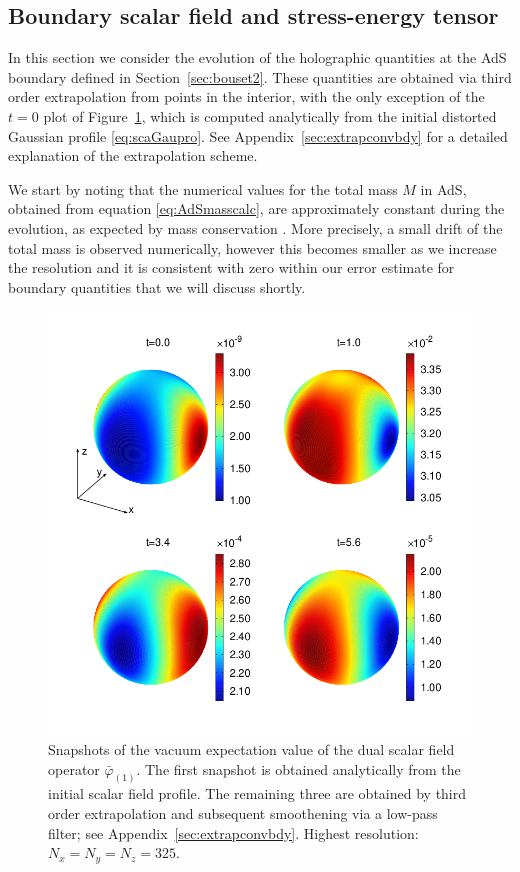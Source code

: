 \documentclass[aps,letterpaper,twocolumn,nofootinbib]{revtex4}
\numberwithin{equation}{section}
\begin{document}
\subsection{Boundary scalar field and stress-energy tensor}
\label{sec:resbouset}

In this section we consider the evolution of the holographic quantities at the AdS boundary defined in Section~\ref{sec:bouset2}. 
These quantities are obtained via third order extrapolation from points in the interior, with the only exception of the $t=0$ plot of Figure~\ref{fig:snapshotsbdyphi}, which is computed analytically from the initial distorted Gaussian profile \eqref{eq:scaGaupro}. 
See Appendix~\ref{sec:extrapconvbdy} for a detailed explanation of the extrapolation scheme.

We start by noting that the numerical values for the total mass $M$ in AdS, obtained from equation \eqref{eq:AdSmasscalc}, are approximately constant during the evolution, as expected by mass conservation \cite{Fischetti:2012rd}. More precisely, a small drift of the total mass is observed numerically, however this becomes smaller as we increase the resolution and it is consistent with zero within our error estimate for boundary quantities that we will discuss shortly.

\begin{figure}[!t]
        \centering
        \includegraphics[width=5.0in,clip=true]{sphereplots_bdyphi_L3_2by2.png}
\parbox{5.0in}{\caption{
Snapshots of the vacuum expectation value of the dual scalar field operator $\bar{\varphi}_{(1)}$. 
The first snapshot is obtained analytically from the initial scalar field profile. The remaining three are obtained by third order extrapolation and subsequent smoothening via a low-pass filter;
see Appendix~\ref{sec:extrapconvbdy}. Highest resolution: $N_x=N_y=N_z=325$.
        }\label{fig:snapshotsbdyphi}}
\end{figure}
\end{document}
